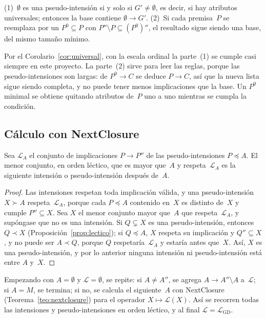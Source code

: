 \begin{proposicion}\label{prop:premisa-vacia}
(1)~$\emptyset$ es una pseudo-intensión si y solo si $G' \neq \emptyset$, es decir, si hay atributos universales; entonces la base contiene $\emptyset \to G'$. (2)~Si cada premisa~$P$ se reemplaza por un $P^0 \subseteq P$ con $P'' \setminus P \subseteq (P^0)''$, el resultado sigue siendo una base, del mismo tamaño mínimo.
\end{proposicion}

Por el Corolario~\ref{cor:universal}, con la escala ordinal la parte~(1) se cumple casi siempre en este proyecto. La parte~(2) sirve para leer las reglas, porque las pseudo-intensiones son largas: de $P^0 \to C$ se deduce $P \to C$, así que la nueva lista sigue siendo completa, y no puede tener menos implicaciones que la base. Un $P^0$ minimal se obtiene quitando atributos de~$P$ uno a uno mientras se cumpla la condición.


\subsection{Cálculo con NextClosure}
\label{sec:calculo-base}

\begin{proposicion}\label{prop:siguiente-pseudo}
Sea $\mathcal{L}_A$ el conjunto de implicaciones $P \to P''$ de las pseudo-intensiones $P \preceq A$. El menor conjunto, en orden léctico, que es mayor que~$A$ y respeta~$\mathcal{L}_A$ es la siguiente intensión o pseudo-intensión después de~$A$.
\end{proposicion}

\begin{proof}
Las intensiones respetan toda implicación válida, y una pseudo-intensión $X \succ A$ respeta~$\mathcal{L}_A$, porque cada $P \preceq A$ contenido en~$X$ es distinto de~$X$ y cumple $P'' \subseteq X$. Sea $X$ el menor conjunto mayor que~$A$ que respeta~$\mathcal{L}_A$, y supóngase que no es una intensión. Si $Q \subsetneq X$ es una pseudo-intensión, entonces $Q \prec X$ (Proposición~\ref{prop:lectico}); si $Q \preceq A$, $X$ respeta su implicación y $Q'' \subseteq X$, y no puede ser $A \prec Q$, porque $Q$ respetaría~$\mathcal{L}_A$ y estaría antes que~$X$. Así, $X$ es una pseudo-intensión, y por lo anterior ninguna intensión ni pseudo-intensión está entre $A$ y~$X$.
\end{proof}

\begin{corolario}[algoritmo]\label{cor:algoritmo-base}
Empezando con $A = \emptyset$ y $\mathcal{L} = \emptyset$, se repite: si $A \neq A''$, se agrega $A \to A'' \setminus A$ a~$\mathcal{L}$; si $A = M$, se termina; si no, se calcula el siguiente~$A$ con NextClosure (Teorema~\ref{teo:nextclosure}) para el operador $X \mapsto \mathcal{L}(X)$. Así se recorren todas las intensiones y pseudo-intensiones en orden léctico, y al final $\mathcal{L} = \mathcal{L}_{\mathrm{GD}}$.
\end{corolario}


